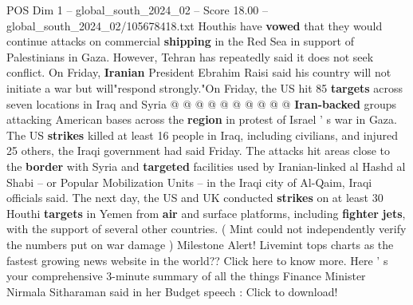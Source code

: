 \begin{textsample}{POS Dim 1 – global\_south\_2024\_02 – Score 18.00 – global\_south\_2024\_02/105678418.txt}
Houthis have \textbf{vowed} that they would continue attacks on commercial \textbf{shipping} in the Red Sea in support of Palestinians in Gaza.
However, Tehran has repeatedly said it does not seek conflict.
On Friday, \textbf{Iranian} President Ebrahim Raisi said his country will not initiate a war but will"respond strongly."On Friday, the US hit 85 \textbf{targets} across seven locations in Iraq and Syria @ @ @ @ @ @ @ @ @ @ \textbf{Iran-backed} groups attacking American bases across the \textbf{region} in protest of Israel ' s war in Gaza.
The US \textbf{strikes} killed at least 16 people in Iraq, including civilians, and injured 25 others, the Iraqi government had said Friday.
The attacks hit areas close to the \textbf{border} with Syria and \textbf{targeted} facilities used by Iranian-linked al Hashd al Shabi -- or Popular Mobilization Units -- in the Iraqi city of Al-Qaim, Iraqi officials said.
The next day, the US and UK conducted \textbf{strikes} on at least 30 Houthi \textbf{targets} in Yemen from \textbf{air} and surface platforms, including \textbf{fighter} \textbf{jets}, with the support of several other countries. ( Mint could not independently verify the numbers put on war damage ) Milestone Alert!
Livemint tops charts as the fastest growing news website in the world??
Click here to know more.
Here ' s your comprehensive 3-minute summary of all the things Finance Minister Nirmala Sitharaman said in her Budget speech : Click to download!

\end{textsample}
